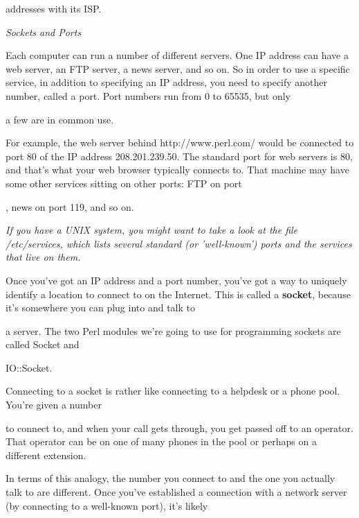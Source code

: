 \documentclass[a4paper,11pt]{book}
\begin{document}
\noindent addresses with its ISP.

\noindent 

\noindent \textit{Sockets and Ports}

\noindent Each computer can run a number of different servers. One IP address can have a web server, an FTP server, a news server, and so on. So in order to use a specific service, in addition to specifying an IP address, you need to specify another number, called a port. Port numbers run from 0 to 65535, but only

\noindent a few are in common use.

\noindent 

\noindent For example, the web server behind http://www.perl.com/ would be connected to port 80 of the IP address 208.201.239.50. The standard port for web servers is 80, and that's what your web browser typically connects to. That machine may have some other services sitting on other ports: FTP on port

, news on port 119, and so on.

\noindent 

\noindent 

\noindent \textit{If you have a UNIX system, you might want to take a look at the file /etc/services, which lists several standard (or 'well-known') ports and the services that live on them.}

\noindent 

\noindent 

\noindent Once you've got an IP address and a port number, you've got a way to uniquely identify a location to connect to on the Internet. This is called a \textbf{socket}, because it's somewhere you can plug into and talk to

\noindent a server. The two Perl modules we're going to use for programming sockets are called Socket and

\noindent IO::Socket.

\noindent 

\noindent Connecting to a socket is rather like connecting to a helpdesk or a phone pool. You're given a number

\noindent to connect to, and when your call gets through, you get passed off to an operator. That operator can be on one of many phones in the pool or perhaps on a different extension.

\noindent 

\noindent In terms of this analogy, the number you connect to and the one you actually talk to are different. Once you've established a connection with a network server (by connecting to a well-known port), it's likely
\end{document}
